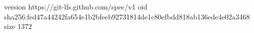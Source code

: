 version https://git-lfs.github.com/spec/v1
oid sha256:fed47a44242fa654e1b2bfeeb92731814de1c80efbdd818ab136ede4e02a3468
size 1372

